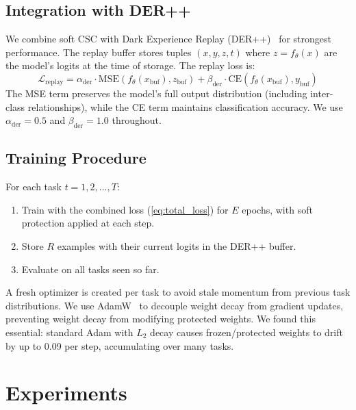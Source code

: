 \documentclass[11pt]{article}
\begin{document}
\subsection{Integration with DER++}

We combine soft CSC with Dark Experience Replay (DER++)~\citep{buzzega2020dark} for strongest performance.
The replay buffer stores tuples $(x, y, z, t)$ where $z = f_\theta(x)$ are the model's logits at the time of storage.
The replay loss is:
\begin{equation}
    \mathcal{L}_{\text{replay}} = \alpha_{\text{der}} \cdot \text{MSE}(f_\theta(x_{\text{buf}}), z_{\text{buf}}) + \beta_{\text{der}} \cdot \text{CE}(f_\theta(x_{\text{buf}}), y_{\text{buf}})
\end{equation}
The MSE term preserves the model's full output distribution (including inter-class relationships), while the CE term maintains classification accuracy.
We use $\alpha_{\text{der}} = 0.5$ and $\beta_{\text{der}} = 1.0$ throughout.

\subsection{Training Procedure}

For each task $t = 1, 2, \ldots, T$:
\begin{enumerate}
    \item Train with the combined loss (\cref{eq:total_loss}) for $E$ epochs, with soft protection applied at each step.
    \item Store $R$ examples with their current logits in the DER++ buffer.
    \item Evaluate on all tasks seen so far.
\end{enumerate}
A fresh optimizer is created per task to avoid stale momentum from previous task distributions.
We use AdamW~\citep{loshchilov2019decoupled} to decouple weight decay from gradient updates, preventing weight decay from modifying protected weights.
We found this essential: standard Adam with $L_2$ decay causes frozen/protected weights to drift by up to 0.09 per step, accumulating over many tasks.

\section{Experiments}
\label{sec:experiments}
\end{document}
